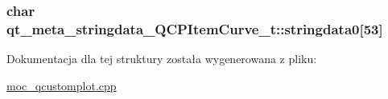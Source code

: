 \subsubsection[{\texorpdfstring{stringdata0}{stringdata0}}]{\setlength{\rightskip}{0pt plus 5cm}char qt\+\_\+meta\+\_\+stringdata\+\_\+\+Q\+C\+P\+Item\+Curve\+\_\+t\+::stringdata0\mbox{[}53\mbox{]}}\hypertarget{structqt__meta__stringdata___q_c_p_item_curve__t_a52ddb589fe5c4e7eba75b1eb50799729}{}\label{structqt__meta__stringdata___q_c_p_item_curve__t_a52ddb589fe5c4e7eba75b1eb50799729}


Dokumentacja dla tej struktury została wygenerowana z pliku\+:\begin{DoxyCompactItemize}
\item 
\hyperlink{moc__qcustomplot_8cpp}{moc\+\_\+qcustomplot.\+cpp}\end{DoxyCompactItemize}
